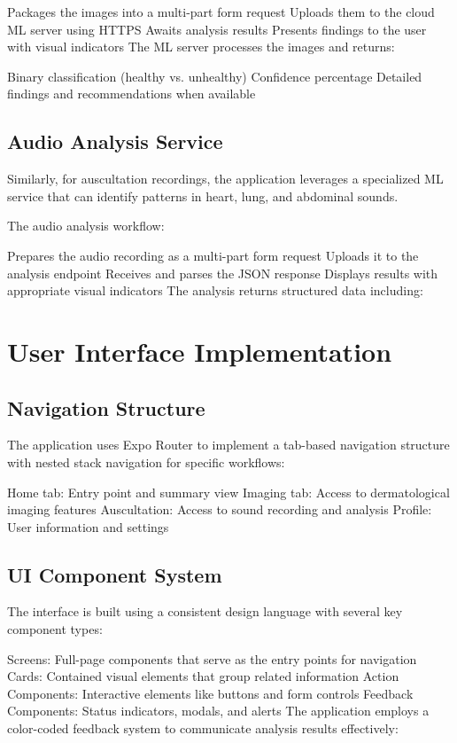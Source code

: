 Packages the images into a multi-part form request
Uploads them to the cloud ML server using HTTPS
Awaits analysis results
Presents findings to the user with visual indicators
The ML server processes the images and returns:

Binary classification (healthy vs. unhealthy)
Confidence percentage
Detailed findings and recommendations when available
\subsection{Audio Analysis Service}

Similarly, for auscultation recordings, the application leverages a specialized ML service that can identify patterns in heart, lung, and abdominal sounds.

The audio analysis workflow:

Prepares the audio recording as a multi-part form request
Uploads it to the analysis endpoint
Receives and parses the JSON response
Displays results with appropriate visual indicators
The analysis returns structured data including:

\section{User Interface Implementation}

\subsection{Navigation Structure}

The application uses Expo Router to implement a tab-based navigation structure with nested stack navigation for specific workflows:

Home tab: Entry point and summary view
Imaging tab: Access to dermatological imaging features
Auscultation: Access to sound recording and analysis
Profile: User information and settings
\subsection{UI Component System}

The interface is built using a consistent design language with several key component types:

Screens: Full-page components that serve as the entry points for navigation
Cards: Contained visual elements that group related information
Action Components: Interactive elements like buttons and form controls
Feedback Components: Status indicators, modals, and alerts
The application employs a color-coded feedback system to communicate analysis results effectively:

